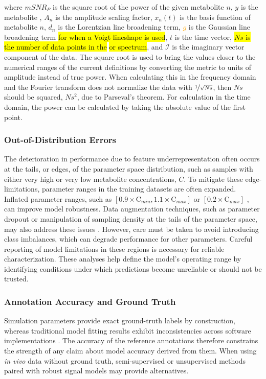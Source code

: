 where $mSNR_P$ is the square root of the power \SNR of the given metabolite $n$, $y$ is the metabolite \FID, $A_n$ is the amplitude scaling factor, $x_n(t)$ is the \FID basis function of metabolite $n$, $d_n$ is the Lorentzian line broadening term, \textcolor{orange}{$g$} is the Gaussian line broadening term \hl{for when a Voigt lineshape is used}, $t$ is the time vector, \hl{$Ns$ is the number of data points in the }\FID \hl{or spectrum}, and $\mathcal{I}$ is the imaginary vector component of the data. The square root is used to bring the \SNR values closer to the numerical ranges of the current definitions by converting the metric to units of amplitude instead of true power. When calculating this in the frequency domain and the Fourier transform does not normalize the data with $\nicefrac{1}{\sqrt{Ns}}$, then $Ns$ should be squared, $Ns^2$, due to Parseval's theorem. For calculation in the time domain, the power can be calculated by taking the absolute value of the first \FID point. 

\subsubsection{Out-of-Distribution Errors}
\label{sec:dataModel:subsec:curation:subsubsec:OOD}
The deterioration in \DL performance due to feature underrepresentation often occurs at the tails, or edges, of the parameter space distribution, such as samples with either very high or very low metabolite concentrations, $C$. To mitigate these edge-limitations, parameter ranges in the training datasets are often expanded. Inflated parameter ranges, such as $[0.9 \times \text{C}_{min}, 1.1 \times \text{C}_{max}]$ \cite{LaMaster2024} or $[0.2 \times \text{C}_{max}]$ \cite{Rizzo2023}, can improve model robustness. Data augmentation techniques, such as parameter dropout or manipulation of sampling density at the tails of the parameter space, may also address these issues \cite{Rizzo2023}. However, care must be taken to avoid introducing class imbalances, which can degrade performance for other parameters. Careful reporting of model limitations in these regions is necessary for reliable characterization. These analyses help define the model's operating range by identifying conditions under which predictions become unreliable or should not be trusted.

\subsubsection{Annotation Accuracy and Ground Truth} 
\label{sec:dataModel:subsec:curation:subsubsec:Annotations}
Simulation parameters provide exact ground-truth labels by construction, whereas traditional model fitting results exhibit inconsistencies across software implementations \cite{Zollner2021, Marjanska2022}. The accuracy of the reference annotations therefore constrains the strength of any claim about model accuracy derived from them. When using \textit{in vivo} data without ground truth, semi-supervised or unsupervised \DL methods paired with robust signal models may provide alternatives.

